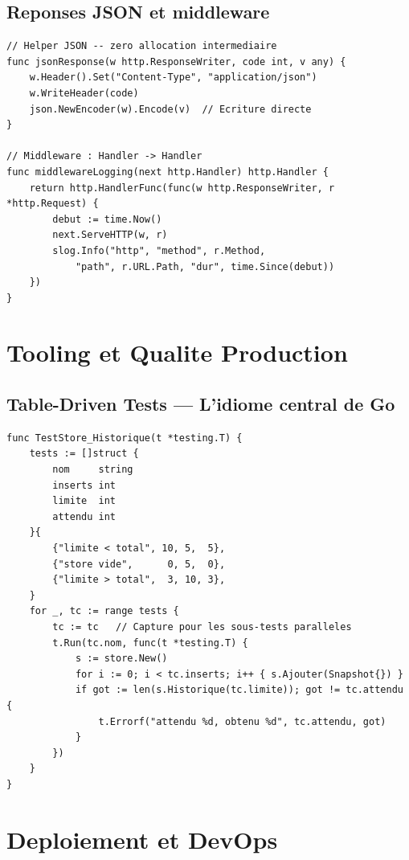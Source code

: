 \documentclass[11pt,a4paper,openany]{book}
\begin{document}
\section{Reponses JSON et middleware}

\begin{lstlisting}[style=goStyle]
// Helper JSON -- zero allocation intermediaire
func jsonResponse(w http.ResponseWriter, code int, v any) {
    w.Header().Set("Content-Type", "application/json")
    w.WriteHeader(code)
    json.NewEncoder(w).Encode(v)  // Ecriture directe
}

// Middleware : Handler -> Handler
func middlewareLogging(next http.Handler) http.Handler {
    return http.HandlerFunc(func(w http.ResponseWriter, r *http.Request) {
        debut := time.Now()
        next.ServeHTTP(w, r)
        slog.Info("http", "method", r.Method,
            "path", r.URL.Path, "dur", time.Since(debut))
    })
}
\end{lstlisting}

\chapter{Tooling et Qualite Production}

\section{Table-Driven Tests --- L'idiome central de Go}

\begin{lstlisting}[style=goStyle]
func TestStore_Historique(t *testing.T) {
    tests := []struct {
        nom     string
        inserts int
        limite  int
        attendu int
    }{
        {"limite < total", 10, 5,  5},
        {"store vide",      0, 5,  0},
        {"limite > total",  3, 10, 3},
    }
    for _, tc := range tests {
        tc := tc   // Capture pour les sous-tests paralleles
        t.Run(tc.nom, func(t *testing.T) {
            s := store.New()
            for i := 0; i < tc.inserts; i++ { s.Ajouter(Snapshot{}) }
            if got := len(s.Historique(tc.limite)); got != tc.attendu {
                t.Errorf("attendu %d, obtenu %d", tc.attendu, got)
            }
        })
    }
}
\end{lstlisting}

\chapter{Deploiement et DevOps}
\end{document}
